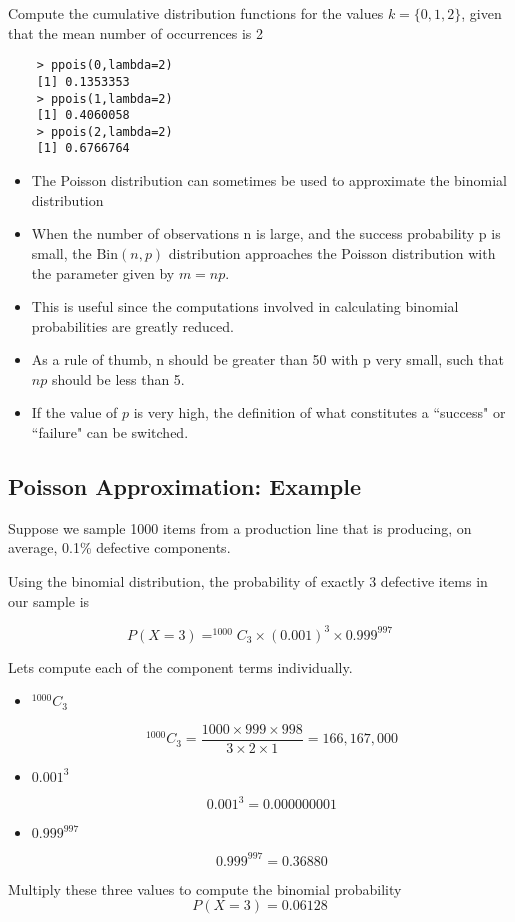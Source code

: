 \documentclass[]{article}
\begin{document}
	Compute the cumulative distribution functions for the values $k=\{0,1,2\}$, given that the mean number of occurrences is 2
	
	\begin{verbatim}
	> ppois(0,lambda=2)
	[1] 0.1353353
	> ppois(1,lambda=2)
	[1] 0.4060058
	> ppois(2,lambda=2)
	[1] 0.6766764
	\end{verbatim}
	

	\begin{itemize}
		\item The Poisson distribution can sometimes be used to approximate the binomial distribution
		\item When the number of observations n is large, and the success probability p is small, the $\mbox{Bin}(n,p)$ distribution approaches the Poisson distribution with the parameter given by $m = np$.
		\item This is useful since the computations involved in calculating binomial probabilities are greatly reduced.
		\item As a rule of thumb, n should be greater than 50 with p very small, such that $np$ should be less than 5.
		\item If the value of $p$ is very high, the definition of what constitutes a ``success" or ``failure" can be switched.
	\end{itemize}
\subsection{Poisson Approximation: Example}
	
	Suppose we sample 1000 items from a production line that is producing, on average, 0.1\% defective components.\\
	
	
	\bigskip
	
	Using the binomial distribution, the probability of exactly 3 defective items in our sample is
	
	\[P(X=3) = ^{1000}C_3 \times (0.001)^3 \times 0.999^{997} \]
	

	Lets compute each of the component terms individually.
	
	
	\begin{itemize}
		\item $^{1000}C_3$
		
		\[ ^{1000}C_3 = \frac{1000 \times 999 \times 998}{3 \times 2 \times 1} =
		166,167,000 \]
		
		\item $0.001^3$
		
		\[0.001^3 = 0.000000001 \]
		
		
		\item $0.999^{997}$
		
		\[0.999^{997} = 0.36880 \]
		
	\end{itemize}
	Multiply these three values to compute the binomial probability \[P(X=3) = 0.06128 \]
	
\end{document}
